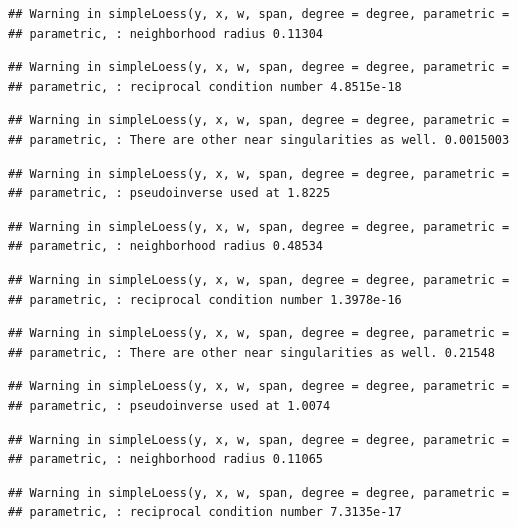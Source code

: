 \documentclass[]{article}
\begin{document}
\begin{verbatim}
## Warning in simpleLoess(y, x, w, span, degree = degree, parametric =
## parametric, : neighborhood radius 0.11304
\end{verbatim}

\begin{verbatim}
## Warning in simpleLoess(y, x, w, span, degree = degree, parametric =
## parametric, : reciprocal condition number 4.8515e-18
\end{verbatim}

\begin{verbatim}
## Warning in simpleLoess(y, x, w, span, degree = degree, parametric =
## parametric, : There are other near singularities as well. 0.0015003
\end{verbatim}

\begin{verbatim}
## Warning in simpleLoess(y, x, w, span, degree = degree, parametric =
## parametric, : pseudoinverse used at 1.8225
\end{verbatim}

\begin{verbatim}
## Warning in simpleLoess(y, x, w, span, degree = degree, parametric =
## parametric, : neighborhood radius 0.48534
\end{verbatim}

\begin{verbatim}
## Warning in simpleLoess(y, x, w, span, degree = degree, parametric =
## parametric, : reciprocal condition number 1.3978e-16
\end{verbatim}

\begin{verbatim}
## Warning in simpleLoess(y, x, w, span, degree = degree, parametric =
## parametric, : There are other near singularities as well. 0.21548
\end{verbatim}

\begin{verbatim}
## Warning in simpleLoess(y, x, w, span, degree = degree, parametric =
## parametric, : pseudoinverse used at 1.0074
\end{verbatim}

\begin{verbatim}
## Warning in simpleLoess(y, x, w, span, degree = degree, parametric =
## parametric, : neighborhood radius 0.11065
\end{verbatim}

\begin{verbatim}
## Warning in simpleLoess(y, x, w, span, degree = degree, parametric =
## parametric, : reciprocal condition number 7.3135e-17
\end{verbatim}
\end{document}
